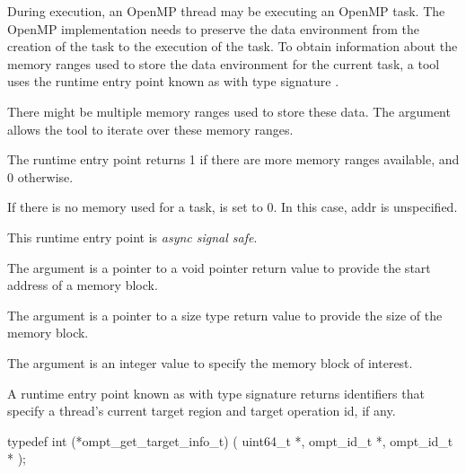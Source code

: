 \descr

During execution, an OpenMP thread may be executing an OpenMP task.
The OpenMP implementation needs to preserve the data environment
from the creation of the task to the execution of the task.
To obtain information about the memory ranges used to store the 
data environment for the current task, 
a tool uses the runtime entry point known as
with type signature . 

There might be multiple memory ranges used to store these data. The
 argument allows the tool to iterate over these memory ranges.

The  runtime entry point
returns 1 if there are more memory ranges available, and 0 otherwise. 

If there is no memory used for a task,  is set to 0. 
In this case, addr is unspecified.

This runtime entry point is \emph{async signal safe}.

\argdesc

The argument  is a pointer to a void pointer return value
to provide the start address of a memory block.  

The argument  is a pointer to a size type return
value to provide the size of the memory block.

The argument  is an integer value to specify the
memory block of interest.

%

\label{sec:ompt_get_target_info_t}
\label{sec:ompt_get_target_info}

\summary
A runtime entry point known as 
with type signature  returns identifiers that specify a
thread's current target region and target operation id, if any.

\format
\begin{ccppspecific}
\begin{omptInquiry}
typedef int (*ompt_get_target_info_t) (
  uint64_t *,
  ompt_id_t *,
  ompt_id_t *
);
\end{omptInquiry}
\end{ccppspecific}


